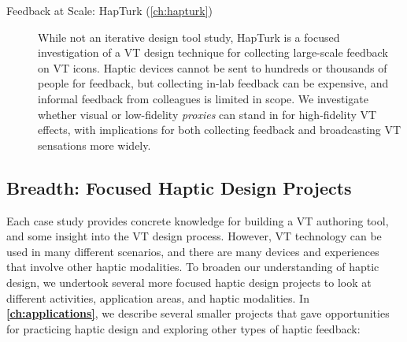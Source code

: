 \begin{description}
	\item[Feedback at Scale: HapTurk (\autoref{ch:hapturk})]
	While not an iterative design tool study, HapTurk is a focused investigation of a VT design technique for collecting large-scale feedback on VT icons.
	Haptic devices cannot be sent to hundreds or thousands of people for feedback, but collecting in-lab feedback can be expensive, and informal feedback from colleagues is limited in scope.
	We investigate whether visual or low-fidelity \emph{proxies} can stand in for high-fidelity VT effects, with implications for both collecting feedback and broadcasting VT sensations more widely.

\end{description}




\subsection{Breadth: Focused Haptic Design Projects}
\label{ch:intro:approach:breadth}
Each case study provides concrete knowledge for building a VT authoring tool, and some insight into the VT design process.
However, VT technology can be used in many different scenarios, and there are many devices and experiences that involve other haptic modalities.
To broaden our understanding of haptic design, we undertook several more focused haptic design projects to look at different activities, application areas, and haptic modalities.
In \textbf{\autoref{ch:applications}}, we describe several smaller projects that gave opportunities for practicing haptic design and exploring other types of haptic feedback:

